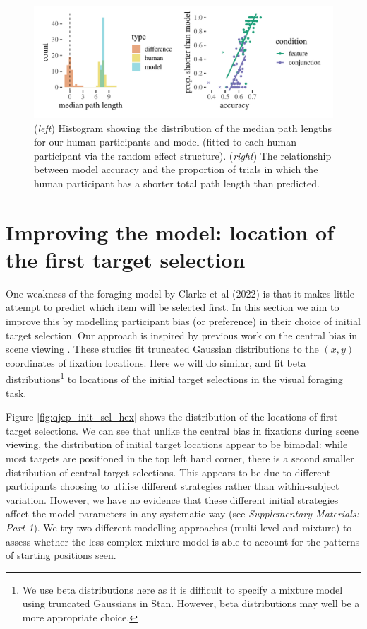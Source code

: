 \documentclass[preprints, article,submit,pdftex,moreauthors]{Definitions/mdpi}
\begin{document}
\begin{figure}[H]
\centering
\includegraphics[width=12 cm]{Figures/path_length.pdf}
\caption{(\textit{left}) Histogram showing the distribution of the median path lengths for our human participants and model (fitted to each human participant via the random effect structure). (\textit{right}) The relationship between model accuracy and the proportion of trials in which the human participant has a shorter total path length than predicted.}
\label{fig:qjep_path_lengths}
\end{figure} 

\section{Improving the model: location of the first target selection}

One weakness of the foraging model by Clarke et al (2022) \cite{clarke2022foraging} is that it makes little attempt to predict which item will be selected first. In this section we aim to improve this by modelling participant bias (or preference) in their choice of initial target selection. Our approach is inspired by previous work on the central bias in scene viewing \cite{clarke_tatler2014, clarke2017}. These studies fit truncated Gaussian distributions to the  $(x,y)$ coordinates of fixation locations. Here we will do similar, and fit beta distributions\footnote{We use beta distributions here as it is difficult to specify a mixture model using truncated Gaussians in Stan. However, beta distributions may well be a more appropriate choice.} to locations of the initial target selections in the visual foraging task. 

Figure \ref{fig:qjep_init_sel_hex} shows the distribution of the locations of first target selections. We can see that unlike the central bias in fixations during scene viewing, the distribution of initial target locations appear to be bimodal: while most targets are positioned in the top left hand corner, there is a second smaller distribution of central target selections. This appears to be due to different participants choosing to utilise different strategies rather than within-subject variation. However, we have no evidence that these different initial strategies affect the model parameters in any systematic way (see \textit{Supplementary Materials: Part 1}). We try two different modelling approaches (multi-level and mixture) to assess whether the less complex mixture model is able to account for the patterns of starting positions seen.
\end{document}
